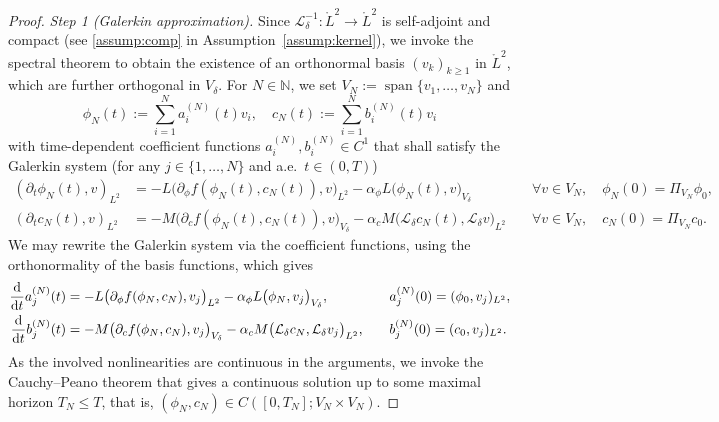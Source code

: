 \documentclass[]{article}
\newcommand{\R}{\mathbb{R}}
\newcommand{\ba}{\mathbf a}
\newcommand{\bb}{\mathbf b}
\newcommand{\N}{\mathbb{N}}
\newcommand{\ddt}{\frac{\textup{d}}{\textup{d}t}}
\begin{document}
\begin{proof} \emph{Step 1 (Galerkin approximation).}
	Since $\mathcal L_\delta^{-1}:\mathring{L}^2 \to \mathring{L}^2$ is self-adjoint and compact (see \eqref{assump:comp} in Assumption~\ref{assump:kernel}), we invoke the spectral theorem to obtain the existence of an orthonormal basis $(v_k)_{k\ge1}$ in $\mathring{L}^2$, which are further orthogonal in $V_\delta$. For $N\in\N$, we set $V_N:=\operatorname{span}\{v_1,\dots,v_N\}$ and
	$$\phi_{N}(t):=\sum_{i=1}^{N}a_i^{(N)}(t)v_i, \quad c_{N}(t):=\sum_{i=1}^{N}b_i^{(N)}(t)v_i$$ with time-dependent coefficient functions
	$a^{(N)}_i,b^{(N)}_i\in C^{1}$ that shall satisfy the Galerkin system (for any $j \in \{1,\dots,N\}$ and a.e.~$t \in (0,T)$)
	\begin{equation}\label{weakform-galerkin}
		\begin{aligned}
			(\partial_t\phi_N(t),v)_{L^2}
			&=-L \bigl(\partial_\phi f(\phi_N(t),c_N(t)),v\bigr)_{L^2}
			-\alpha_\phi  L \bigl(\phi_N(t),v\bigr)_{V_\delta}
			&&~\forall v\in V_N,
			\quad
			\phi_N(0)=\Pi_{V_N} \phi_0, \\
			(\partial_tc_N(t),v)_{L^2}
			&=-M \bigl(\partial_c f(\phi_N(t),c_N(t)),v\bigr)_{V_\delta} -\alpha_c M\bigl(\mathcal{L}_\delta c_N(t),\mathcal{L}_\delta v\bigr)_{L^2}
			&&~\forall v\in V_N,
			\quad
			c_N(0)=\Pi_{V_N}c_0.
		\end{aligned}
	\end{equation}
	We may rewrite the Galerkin system via the coefficient functions, using the orthonormality of the basis functions, which gives
	\begin{equation}\label{galerkin-ODE2}
		\begin{aligned}
			\ddt a^{(N)}_j(t)
			&= -L\bigl(\partial_\phi f(\phi_N,c_N),v_j\bigr)_{L^2}
			-\alpha_\phi L\bigl(\phi_N,v_j\bigr)_{V_\delta},
			&&\quad 
			a^{(N)}_j(0)=(\phi_0,v_j)_{L^2}, \\
			\ddt b^{(N)}_j(t)
			&= -M\bigl(\partial_c f(\phi_N,c_N),v_j\bigr)_{V_\delta} -\alpha_c M\bigl(\mathcal{L}_\delta c_N,\mathcal{L}_\delta v_j\bigr)_{L^2},
			&&\quad 
			b^{(N)}_j(0)=(c_0,v_j)_{L^2}.
		\end{aligned}
	\end{equation}
	As the involved nonlinearities are continuous in the arguments, we invoke the Cauchy--Peano theorem that gives a continuous solution up to some maximal horizon $T_N\leq T$, that is, $(\phi_N,c_N) \in C([0,T_N];V_N\times V_N)$. \smallskip
	

\end{proof}
\end{document}
